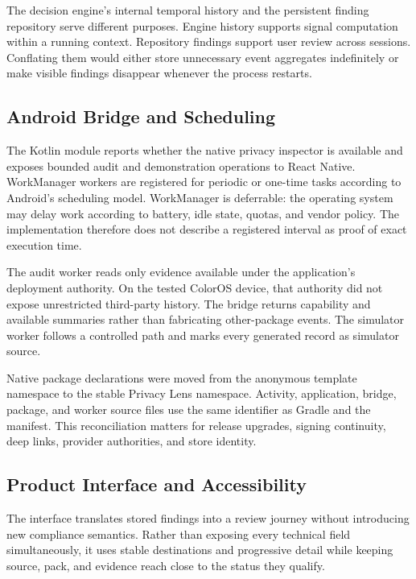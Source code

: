 The decision engine's internal temporal history and the persistent finding repository serve different purposes. Engine history supports signal computation within a running context. Repository findings support user review across sessions. Conflating them would either store unnecessary event aggregates indefinitely or make visible findings disappear whenever the process restarts.

\subsection{Android Bridge and Scheduling}

The Kotlin module reports whether the native privacy inspector is available and exposes bounded audit and demonstration operations to React Native. WorkManager workers are registered for periodic or one-time tasks according to Android's scheduling model. WorkManager is deferrable: the operating system may delay work according to battery, idle state, quotas, and vendor policy. The implementation therefore does not describe a registered interval as proof of exact execution time.

The audit worker reads only evidence available under the application's deployment authority. On the tested ColorOS device, that authority did not expose unrestricted third-party history. The bridge returns capability and available summaries rather than fabricating other-package events. The simulator worker follows a controlled path and marks every generated record as simulator source.

Native package declarations were moved from the anonymous template namespace to the stable Privacy Lens namespace. Activity, application, bridge, package, and worker source files use the same identifier as Gradle and the manifest. This reconciliation matters for release upgrades, signing continuity, deep links, provider authorities, and store identity.

\subsection{Product Interface and Accessibility}

The interface translates stored findings into a review journey without introducing new compliance semantics. Rather than exposing every technical field simultaneously, it uses stable destinations and progressive detail while keeping source, pack, and evidence reach close to the status they qualify.

